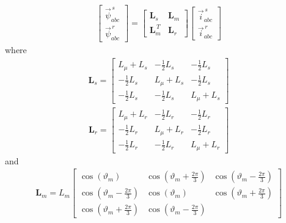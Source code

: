 \documentclass[12pt,a4paper,oneside]{book}
\begin{document}
\begin{onehalfspace}
\begin{equation}
	\begin{aligned}
		\begin{bmatrix} \vec{\psi}^{\,s}_{abc} \\[6pt] \vec{\psi}^{\,r}_{abc} 
		\end{bmatrix} = \begin{bmatrix} \mathbf{L}_s & \mathbf{L}_{m} \\[6pt] 
			\mathbf{L}_{m}^{\,T} & \mathbf{L}_{r} \end{bmatrix}\begin{bmatrix} 
			\vec{i}^{\,s}_{abc} \\[6pt] \vec{i}^{\,r}_{abc} \end{bmatrix}
	\end{aligned}
\end{equation}
where
\begin{equation}\label{im_eq_6}
	\begin{aligned}
		\mathbf{L}_s = \begin{bmatrix} L_\mu+L_s & -\frac{1}{2}L_s & 
			-\frac{1}{2}L_s \\[6pt] -\frac{1}{2}L_s & L_\mu+L_s & 
			-\frac{1}{2}L_s 
			\\[6pt] -\frac{1}{2}L_s & -\frac{1}{2}L_s & L_\mu+L_s \end{bmatrix}
	\end{aligned}
\end{equation}
\begin{equation}\label{im_eq_7}
	\begin{aligned}
		\mathbf{L}_r = \begin{bmatrix} L_\mu+L_r & -\frac{1}{2}L_r & 
			-\frac{1}{2}L_r \\[6pt] -\frac{1}{2}L_r & L_\mu+L_r & 
			-\frac{1}{2}L_r 
			\\[6pt] -\frac{1}{2}L_r & -\frac{1}{2}L_r & L_\mu+L_r \end{bmatrix}
	\end{aligned}
\end{equation}
and
\begin{equation}\label{im_eq_8}
	\begin{aligned}
		\mathbf{L}_m = L_m\begin{bmatrix} \cos(\vartheta_{m}) & 
			\cos(\vartheta_{m}+\frac{2\pi}{3}) & 
			\cos(\vartheta_{m}-\frac{2\pi}{3}) 
			\\[6pt] \cos(\vartheta_{m}-\frac{2\pi}{3}) & \cos(\vartheta_{m}) & 
			\cos(\vartheta_{m}+\frac{2\pi}{3}) \\[6pt] 
			\cos(\vartheta_{m}+\frac{2\pi}{3}) & 
			\cos(\vartheta_{m}-\frac{2\pi}{3}) 

\end{bmatrix}
\end{aligned}
\end{equation}
\end{onehalfspace}
\end{document}
